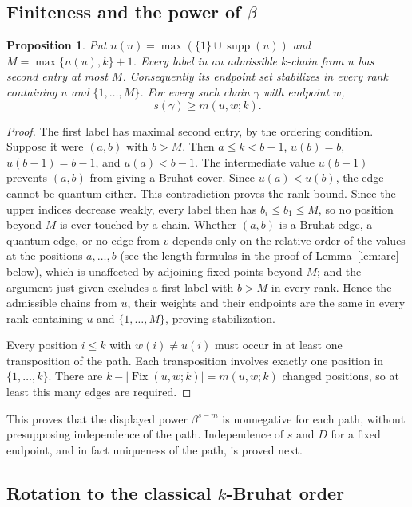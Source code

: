 \documentclass[11pt]{article}
\newtheorem{proposition}{Proposition}
\newcommand{\Fix}{\operatorname{Fix}}
\DeclareMathOperator{\supp}{supp}
\begin{document}
\subsection{Finiteness and the power of \texorpdfstring{$\beta$}{beta}}

\begin{proposition}\label{prop:rank}
Put $n(u)=\max(\{1\}\cup\supp(u))$ and
$M=\max\{n(u),k\}+1$.
Every label in an admissible $k$-chain from $u$ has second
entry at most $M$. Consequently its endpoint set stabilizes
in every rank containing $u$ and $\{1,\ldots,M\}$.
For every such chain $\gamma$ with endpoint $w$,
\[
 s(\gamma)\geq m(u,w;k).
\]
\end{proposition}

\begin{proof}
The first label has maximal second entry, by the ordering condition.
Suppose it were $(a,b)$ with $b>M$. Then $a\leq k<b-1$,
$u(b)=b$, $u(b-1)=b-1$, and $u(a)<b-1$.
The intermediate value $u(b-1)$ prevents $(a,b)$ from giving a
Bruhat cover. Since $u(a)<u(b)$, the edge cannot be quantum either.
This contradiction proves the rank bound.
Since the upper indices decrease weakly, every label then has
$b_i\leq b_1\leq M$, so no position beyond $M$ is ever touched by a
chain. Whether $(a,b)$ is a Bruhat edge, a quantum edge, or no edge
from $v$ depends only on the relative order of the values at the
positions $a,\ldots,b$ (see the length formulas in the proof of
Lemma~\ref{lem:arc} below), which is unaffected by adjoining fixed
points beyond $M$; and the argument just given excludes a first label
with $b>M$ in every rank. Hence the admissible chains from $u$, their
weights and their endpoints are the same in every rank containing
$u$ and $\{1,\ldots,M\}$, proving stabilization.

Every position $i\leq k$ with $w(i)\ne u(i)$ must occur in at least
one transposition of the path. Each transposition involves exactly
one position in $\{1,\ldots,k\}$. There are
$k-|\Fix(u,w;k)|=m(u,w;k)$ changed positions, so at least this
many edges are required.
\end{proof}

This proves that the displayed power $\beta^{s-m}$ is nonnegative
for each path, without presupposing independence of the path.
Independence of $s$ and $D$ for a fixed endpoint, and in fact
uniqueness of the path, is proved next.

\subsection{Rotation to the classical \texorpdfstring{$k$}{k}-Bruhat order}
\label{sec:rotation}
\end{document}
